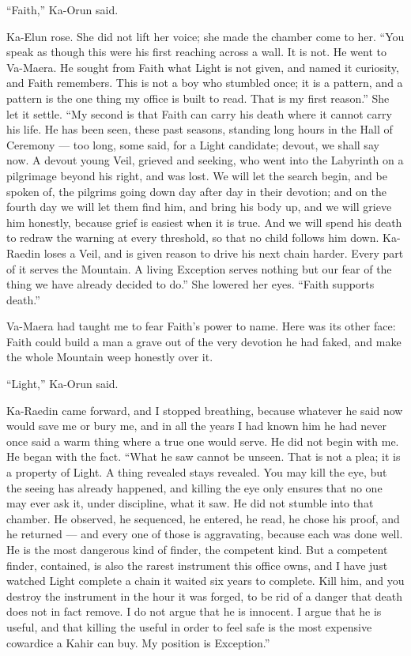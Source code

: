``Faith,'' Ka-Orun said.\par
 
Ka-Elun rose. She did not lift her voice; she made the chamber come to her. ``You speak as though this were his first reaching across a wall. It is not. He went to Va-Maera. He sought from Faith what Light is not given, and named it curiosity, and Faith remembers. This is not a boy who stumbled once; it is a pattern, and a pattern is the one thing my office is built to read. That is my first reason.'' She let it settle. ``My second is that Faith can carry his death where it cannot carry his life. He has been seen, these past seasons, standing long hours in the Hall of Ceremony — too long, some said, for a Light candidate; devout, we shall say now. A devout young Veil, grieved and seeking, who went into the Labyrinth on a pilgrimage beyond his right, and was lost. We will let the search begin, and be spoken of, the pilgrims going down day after day in their devotion; and on the fourth day we will let them find him, and bring his body up, and we will grieve him honestly, because grief is easiest when it is true. And we will spend his death to redraw the warning at every threshold, so that no child follows him down. Ka-Raedin loses a Veil, and is given reason to drive his next chain harder. Every part of it serves the Mountain. A living Exception serves nothing but our fear of the thing we have already decided to do.'' She lowered her eyes. ``Faith supports death.''\par
 
Va-Maera had taught me to fear Faith's power to name. Here was its other face: Faith could build a man a grave out of the very devotion he had faked, and make the whole Mountain weep honestly over it.\par
 
``Light,'' Ka-Orun said.\par
 
Ka-Raedin came forward, and I stopped breathing, because whatever he said now would save me or bury me, and in all the years I had known him he had never once said a warm thing where a true one would serve. He did not begin with me. He began with the fact. ``What he saw cannot be unseen. That is not a plea; it is a property of Light. A thing revealed stays revealed. You may kill the eye, but the seeing has already happened, and killing the eye only ensures that no one may ever ask it, under discipline, what it saw. He did not stumble into that chamber. He observed, he sequenced, he entered, he read, he chose his proof, and he returned — and every one of those is aggravating, because each was done well. He is the most dangerous kind of finder, the competent kind. But a competent finder, contained, is also the rarest instrument this office owns, and I have just watched Light complete a chain it waited six years to complete. Kill him, and you destroy the instrument in the hour it was forged, to be rid of a danger that death does not in fact remove. I do not argue that he is innocent. I argue that he is useful, and that killing the useful in order to feel safe is the most expensive cowardice a Kahir can buy. My position is Exception.''\par
 
